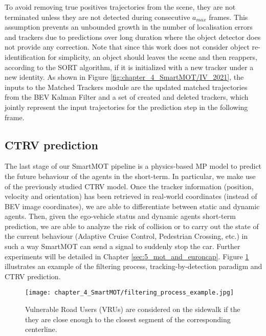 To avoid removing true positives trajectories from the scene, they are not terminated unless they are not detected during consecutive $a_{max}$ frames. This assumption prevents an unbounded growth in the number of localisation errors and trackers due to predictions over long duration where the object detector does not provide any correction. Note that since this work does not consider object re-identification for simplicity, an object should leaves the scene and then reappers, according to the SORT algorithm, if it is initialized with a new tracker under a new identity. As shown in Figure \ref{fig:chapter_4_SmartMOT/IV_2021}, the inputs to the Matched Trackers module are the updated matched trajectories from the BEV Kalman Filter and a set of created and deleted trackers, which jointly represent the input trajectories for the prediction step in the following frame.

\subsection{CTRV prediction}
\label{subsec:4_smartmot_ctrv_prediction}

The last stage of our SmartMOT pipeline is a physics-based \ac{MP} model to predict the future behaviour of the agents in the short-term. In particular, we make use of the previously studied \ac{CTRV} model. Once the tracker information (position, velocity and orientation) has been retrieved in real-world coordinates (instead of \ac{BEV} image coordinates), we are able to differentiate between static and dynamic agents. Then, given the ego-vehicle status and dynamic agents short-term prediction, we are able to analyze the risk of collision or to carry out the state of the current behaviour (Adaptive Cruise Control, Pedestrian Crossing, etc.) in such a way SmartMOT can send a signal to suddenly stop the car. Further experiments will be detailed in Chapter \ref{sec:5_mot_and_euroncap}. Figure \ref{fig:chapter_4_SmartMOT/filtering_process_example} illustrates an example of the filtering process, tracking-by-detection paradigm and \ac{CTRV} prediction.

\begin{figure}[] 
	\centering
	\texttt{[image: chapter\_4\_SmartMOT/filtering\_process\_example.jpg]}
	\caption{Vulnerable Road Users (VRUs) are considered on the sidewalk if the they are close enough to the closest segment of the corresponding centerline.}
	\label{fig:chapter_4_SmartMOT/filtering_process_example}
\end{figure} 

